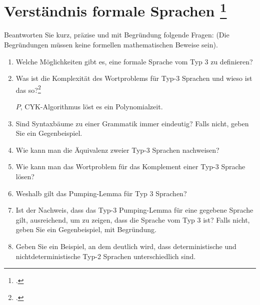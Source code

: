 \documentclass{lehramt-informatik-aufgabe}
\begin{document}
\section{Verständnis formale Sprachen
\footcite{66115:2016:03}}

Beantworten Sie kurz, präzise und mit Begründung folgende Fragen: (Die
Begründungen müssen keine formellen mathematischen Beweise sein).

\begin{enumerate}


\item Welche Möglichkeiten gibt es, eine formale Sprache vom Typ 3 zu
definieren?

\item Was ist die Komplexität des Wortproblems für Typ-3 Sprachen und
wieso ist das so?\footcite[Aufgabe 5a)]{theo:ab:5}

\begin{liAntwort}
$P$, CYK-Algorithmus löst es ein Polynomialzeit.
\end{liAntwort}


\item Sind Syntaxbäume zu einer Grammatik immer eindeutig? Falls nicht,
geben Sie ein Gegenbeispiel.


\item Wie kann man die Äquivalenz zweier Typ-3 Sprachen nachweisen?

\item Wie kann man das Wortproblem für das Komplement einer Typ-3
Sprache lösen?

\item Weshalb gilt das Pumping-Lemma für Typ 3 Sprachen?


\item Ist der Nachweis, dass das Typ-3 Pumping-Lemma für eine gegebene
Sprache gilt, ausreichend, um zu zeigen, dass die Sprache vom Typ 3 ist?
Falls nicht, geben Sie ein Gegenbeispiel, mit Begründung.


\item Geben Sie ein Beispiel, an dem deutlich wird, dass
deterministische und nichtdeterministische Typ-2 Sprachen
unterschiedlich sind.



\end{enumerate}
\end{document}
